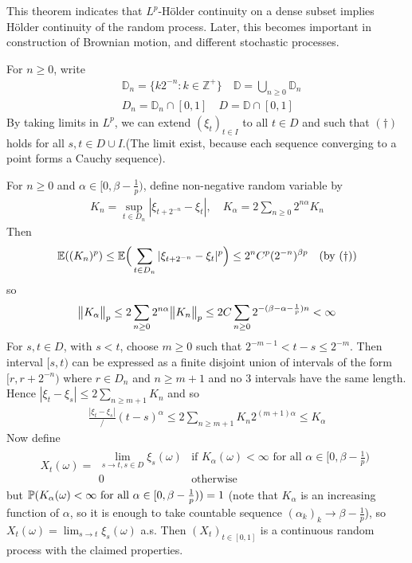 \documentclass[12pt,a4paper]{report}
\newenvironment{proof}
{\begin{changemargin}{1cm}{0.5cm} 
	}%
	{\end{changemargin}
}
\begin{document}
This theorem indicates that $L^p$-H\"{o}lder continuity on a dense subset implies H\"{o}lder continuity of the random process. Later, this becomes important in construction of Brownian motion, and different stochastic processes.
\begin{proof}
\pf For $n \geq 0$, write
\begin{align*}
& \mathbb{D}_n = \{ k2^{-n}  : k \in \mathbb{Z}^+ \} \quad \mathbb{D}= \bigcup_{n\geq 0} \mathbb{D}_n \\
& D_n = \mathbb{D}_n \cap [0,1] \quad D = \mathbb{D} \cap [0,1]
\end{align*}
By taking limits in $L^p$, we can extend $(\xi_t)_{t\in I}$ to all $t\in D$ and such that $(\dagger)$ holds for all $s,t\in D\cup I$.(The limit exist, because each sequence converging to a point forms a Cauchy sequence).

\quad For $n \geq 0$ and $\alpha \in [0, \beta - \frac{1}{p})$, define non-negative random variable by
\begin{align*}
K_n = \sup_{t\in D_n} |\xi_{t+ 2^{-n}} - \xi_t|, \quad K_{\alpha} =2\sum_{n\geq 0} 2^{n\alpha} K_n
\end{align*}
Then
\begin{align*}
\mathbb{E}((K_n)^p) \leq \mathbb{E} \Big( \sum_{t\in D_n} |\xi_{t+{2^{-n}}} - \xi_t |^p \Big) \leq 2^n C^p (2^{-n})^{\beta p} \quad (\text{by } (\dagger))
\end{align*}
so
\begin{align*}
\bigl\lVert K_{\alpha}\bigr\rVert_{p} \leq 2 \sum_{n\geq 0} 2^{n\alpha} \bigl\lVert K_n\bigr\rVert_{p} \leq 2C \sum_{n\geq 0} 2^{-(\beta - \alpha - \frac{1}{p})n} < \infty
\end{align*}
For $s,t\in D$, with $s<t$, choose $m\geq 0$ such that $2^{-m-1} <t-s \leq 2^{-m}$. Then interval $[s,t)$ can be expressed as a finite disjoint union of intervals of the form $[r, r+ 2^{-n})$ where $r\in D_n$ and $n\geq m+1$ and no 3 intervals have the same length. Hence $|\xi_t - \xi_s | \leq 2\sum_{n\geq m+1} K_n$ and so 
\begin{align*}
\frac{|\xi_t - \xi_s|}/{(t-s)^{\alpha}} \leq 2\sum_{n\geq m+1} K_n 2^{(m+1)\alpha} \leq K_{\alpha}
\end{align*}
Now define
\begin{align*}
X_t(\omega) = \begin{array}{ll}
\lim_{s\rightarrow t, s\in D} \xi_s (\omega)  & \text{if } K_{\alpha}(\omega) < \infty \text{ for all } \alpha \in [0,\beta -\frac{1}{p}) \\
0 & \text{otherwise}
\end{array}
\end{align*}
but $\mathbb{P}(K_{\alpha}(\omega) < \infty \text{ for all } \alpha \in [0,\beta -\frac{1}{p})) =1$ (note that $K_{\alpha}$ is an increasing function of $\alpha$, so it is enough to take countable sequence $(\alpha_k)_k\rightarrow \beta -\frac{1}{p}$), so $X_t(\omega) = \lim_{s\rightarrow t}\xi_s(\omega)$ a.s. Then $(X_t)_{t\in [0,1]}$ is a continuous random process with the claimed properties.

\eop
\end{proof}
\s
\end{document}
